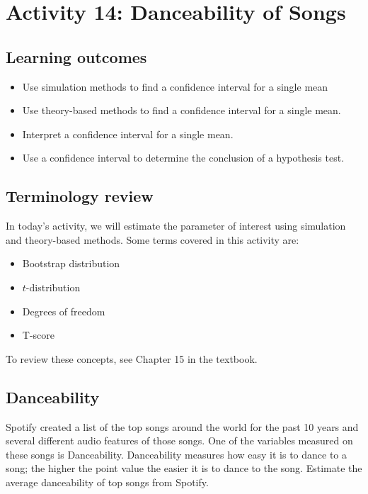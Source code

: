 \documentclass[
]{report}
\begin{document}
\vspace{0.8in}

\newpage

\section{Activity 14: Danceability of Songs}\label{activity-14-danceability-of-songs}


\subsection{Learning outcomes}\label{learning-outcomes-3}

\begin{itemize}
\item
  Use simulation methods to find a confidence interval for a single mean
\item
  Use theory-based methods to find a confidence interval for a single mean.
\item
  Interpret a confidence interval for a single mean.
\item
  Use a confidence interval to determine the conclusion of a hypothesis test.
\end{itemize}

\subsection{Terminology review}\label{terminology-review-3}

In today's activity, we will estimate the parameter of interest using simulation and theory-based methods. Some terms covered in this activity are:

\begin{itemize}
\item
  Bootstrap distribution
\item
  \(t\)-distribution
\item
  Degrees of freedom
\item
  T-score
\end{itemize}

To review these concepts, see Chapter 15 in the textbook.

\subsection{Danceability}\label{danceability}

Spotify created a list of the top songs around the world for the past 10 years and several different audio features of those songs. One of the variables measured on these songs is Danceability. Danceability measures how easy it is to dance to a song; the higher the point value the easier it is to dance to the song. Estimate the average danceability of top songs from Spotify.
\end{document}

